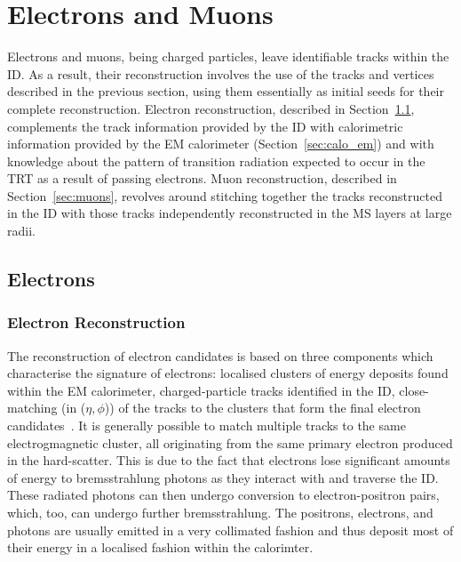 \section{Electrons and Muons}
\label{sec:leptons}

Electrons and muons, being charged particles, leave identifiable tracks
within the ID.
As a result, their reconstruction involves the use of the tracks and
vertices described in the previous section, using them essentially as initial
seeds for their complete reconstruction.
Electron reconstruction, described in Section~\ref{sec:electrons}, complements the track information provided by the ID
with calorimetric information provided by the EM calorimeter (Section~\ref{sec:calo_em})
and with knowledge about the pattern of transition radiation expected to occur
in the TRT as a result of passing electrons.
Muon reconstruction, described in Section~\ref{sec:muons}, revolves around stitching together the tracks reconstructed
in the ID with those tracks independently reconstructed in the MS layers at large radii.

\subsection{Electrons}
\label{sec:electrons}

\subsubsection{Electron Reconstruction}
\label{sec:electron_reco}

The reconstruction of electron candidates is based on three components which
characterise the signature of electrons: localised clusters of energy
deposits found within the EM calorimeter, charged-particle tracks
identified in the ID, close-matching (in ($\eta,\phi$)) of the tracks to the clusters
that form the final electron candidates~\cite{Aaboud:2657964}.
It is generally possible to match multiple tracks to the same electrogmagnetic cluster,
all originating from the same primary electron produced in the hard-scatter.
This is due to the fact that electrons lose significant amounts of energy to bremsstrahlung
photons as they interact with and traverse the ID.
These radiated photons can then undergo conversion to electron-positron pairs,
which, too, can undergo further bremsstrahlung.
The positrons, electrons, and photons are usually emitted in a very collimated fashion
and thus deposit most of their energy in a localised fashion within the calorimter.


